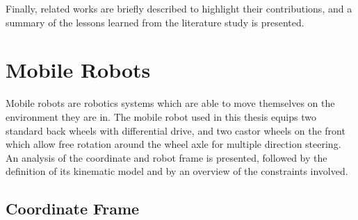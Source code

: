 Finally, related works are briefly described to highlight their contributions, and a summary of the lessons learned from the literature study is presented.


\section{Mobile Robots}

\noindent Mobile robots are robotics systems which are able to move themselves on the environment they are in.
The mobile robot used in this thesis equips two standard back wheels with differential drive, and two castor wheels on the front which allow free rotation around the wheel axle for multiple direction steering.
An analysis of the coordinate and robot frame is presented, followed by the definition of its kinematic model and by an overview of the constraints involved.

\subsection{Coordinate Frame}

